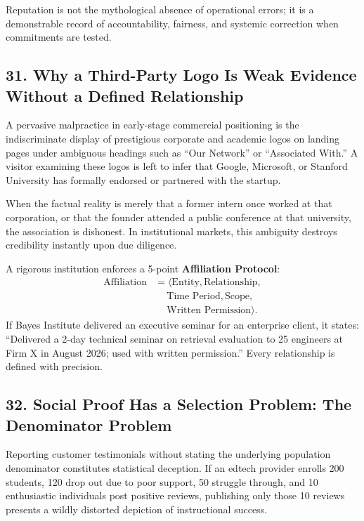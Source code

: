 Reputation is not the mythological absence of operational errors; it is a demonstrable record of accountability, fairness, and systemic correction when commitments are tested.

\subsection*{31. Why a Third-Party Logo Is Weak Evidence Without a Defined Relationship}

A pervasive malpractice in early-stage commercial positioning is the indiscriminate display of prestigious corporate and academic logos on landing pages under ambiguous headings such as ``Our Network'' or ``Associated With.'' A visitor examining these logos is left to infer that Google, Microsoft, or Stanford University has formally endorsed or partnered with the startup.

When the factual reality is merely that a former intern once worked at that corporation, or that the founder attended a public conference at that university, the association is dishonest. In institutional markets, this ambiguity destroys credibility instantly upon due diligence. 

A rigorous institution enforces a 5-point \textbf{Affiliation Protocol}:
\begin{equation}
\begin{aligned}
\text{Affiliation} &= \langle\text{Entity}, \text{Relationship}, \\
&\quad\ \text{Time Period}, \text{Scope}, \\
&\quad\ \text{Written Permission}\rangle.
\end{aligned}
\end{equation}
If Bayes Institute delivered an executive seminar for an enterprise client, it states: ``Delivered a 2-day technical seminar on retrieval evaluation to 25 engineers at Firm X in August 2026; used with written permission.'' Every relationship is defined with precision.

\subsection*{32. Social Proof Has a Selection Problem: The Denominator Problem}

Reporting customer testimonials without stating the underlying population denominator constitutes statistical deception. If an edtech provider enrolls 200 students, 120 drop out due to poor support, 50 struggle through, and 10 enthusiastic individuals post positive reviews, publishing only those 10 reviews presents a wildly distorted depiction of instructional success.

